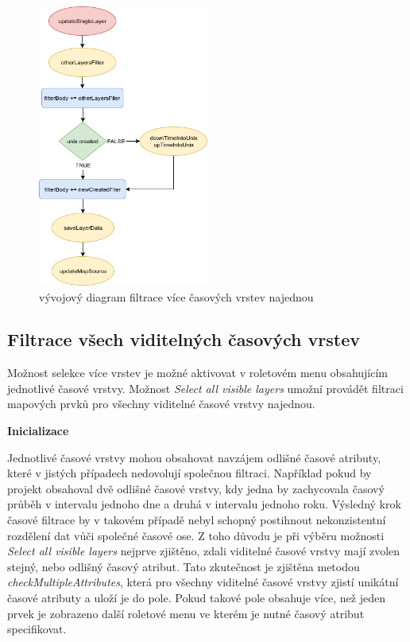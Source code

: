 \begin{figure}[h!]
	\centering
	\includegraphics[width=0.5\textwidth]{../img/getSingleLayer.png}
	\caption{vývojový diagram filtrace více časových vrstev najednou}
	\label{fig:single-chart}
\end{figure}

\subsection{Filtrace všech viditelných časových vrstev}

Možnost selekce více vrstev je možné aktivovat v roletovém menu obsahujícím jednotlivé časové vrstvy. Možnost \textit{Select all visible layers} umožní provádět filtraci mapových prvků pro všechny viditelné časové vrstvy najednou.

\bigskip
\noindent \textbf{Inicializace}

Jednotlivé časové vrstvy mohou obsahovat navzájem odlišné časové atributy, které v jistých případech nedovolují společnou filtraci. Například pokud by projekt obsahoval dvě odlišné časové vrstvy, kdy jedna by zachycovala časový průběh v intervalu jednoho dne a druhá v intervalu jednoho roku. Výsledný krok časové filtrace by v takovém případě nebyl schopný postihnout nekonzistentní rozdělení dat vůči společné časové ose. Z toho důvodu je při výběru možnosti \textit{Select all visible layers} nejprve zjištěno, zdali viditelné časové vrstvy mají zvolen stejný, nebo odlišný časový atribut. Tato zkutečnost je zjištěna metodou \textit{checkMultipleAttributes}, která pro všechny viditelné časové vrstvy zjistí unikátní časové atributy a uloží je do pole. Pokud takové pole obsahuje více, než jeden prvek je zobrazeno další roletové menu ve kterém je nutné časový atribut specifikovat.

